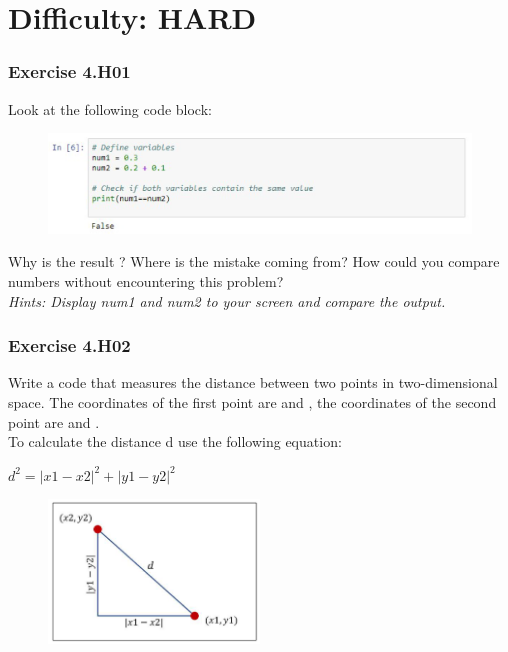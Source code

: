 


\section{Difficulty: HARD}

\subsubsection*{Exercise 4.H01}
Look at the following code block:
\begin{figure}[H]
		\centering
		\includegraphics[width=\textwidth]{../IMG/4H01.png} 
\end{figure}
Why is the result {}? Where is the mistake coming from? How could you compare
numbers without encountering this problem?\\

\textit{Hints:
Display num1 and num2 to your screen and compare the output.}\\[1cm]



\subsubsection*{Exercise 4.H02 \red{[M]}}
Write a code that measures the distance between two points in two-dimensional space. The
coordinates of the first point are {} and {}, the coordinates of the second point are {} and {}.\\
To calculate the distance d use the following equation:

\begin{center}
$d^2 = |x1 -x2|^2 + |y1-y2|^2$
\end{center}

\begin{figure}[H]
		\centering
		\includegraphics[width=0.5\textwidth]{../IMG/4H02.png} 
\end{figure}

